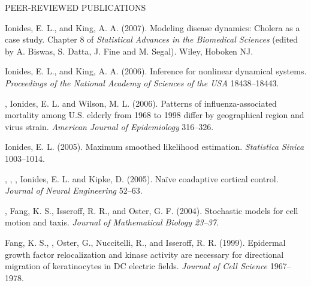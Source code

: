\begin{reflist}{PEER-REVIEWED PUBLICATIONS}
\item\formal{[[\ionidesBOOK] ]}  
Ionides, E. L.,  and King, A. A. (2007). 
 Modeling disease dynamics: Cholera as a case study.
 Chapter 8 of {\em  Statistical Advances in the Biomedical Sciences} (edited by A. Biswas, S. Datta, J. Fine and M. Segal). Wiley, Hoboken NJ.


\item\formal{[[\ionidesPNAS] ]}  
Ionides, E. L.,  and King, A. A. (2006). 
 Inference for nonlinear dynamical systems.
 {\em Proceedings of the National Academy of Sciences of the USA} {}{\separator}18438--18443.


\item\formal{[[\greeneAJE] ]} 
, Ionides, E. L. and Wilson,
  M. L. (2006). Patterns of influenza-associated mortality among
  U.S. elderly from 1968 to 1998 differ by geographical region
  and virus strain. {\em American Journal of
  Epidemiology} {}{\separator}316--326. 


\item\formal{[[\ionidesSINICA] ]} 
Ionides, E. L. (2005). Maximum smoothed likelihood estimation.
 {\em Statistica Sinica} {}{\separator}1003--1014.


\item\formal{[[\gageJNE] ]}  
,  , 
   , Ionides, E. L. and
  Kipke, D. (2005). Na\"{i}ve coadaptive cortical control. 
  {\em Journal of Neural Engineering} {}{\separator}52--63. 


\item\formal{[[\ionidesJMB] ]}  
 ,  Fang, K. S.,  Isseroff, R. R., and  Oster, G. F. (2004).  Stochastic models for cell motion and taxis. {\em
 Journal of Mathematical Biology {}{\separator}23--37}.


\item\formal{[[\fangJCS] ]}  
 Fang, K. S.,  ,  Oster, G.,  
Nuccitelli, R.,   and Isseroff, R. R. (1999). Epidermal growth factor 
relocalization and kinase activity are necessary for directional
migration of keratinocytes in DC electric fields. 
{\em Journal of Cell Science} {}{\separator}1967--1978.
\end{reflist}


\lsp


